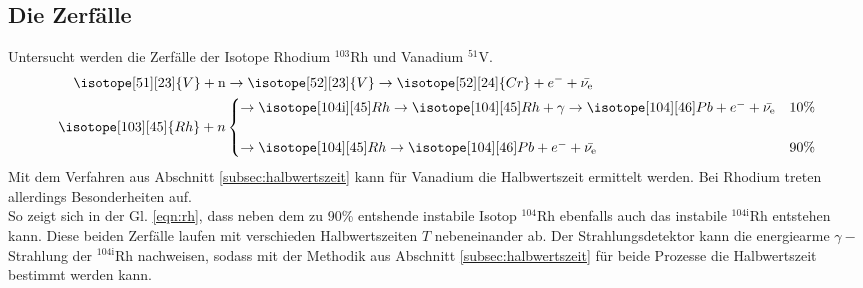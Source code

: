 \subsection{Die Zerfälle}
Untersucht werden die Zerfälle der Isotope Rhodium $^{103}$Rh und Vanadium $^{51}$V.
\begin{align}
    \isotope[51][23]{V} + \text{n} &\to \isotope[52][23]{V} \to \isotope[52][24]{Cr} + e^- + \bar{\nu_{\text{e}}}\\
    \isotope[103][45]{Rh}+n&
    \begin{cases}
        \to \isotope[104\text{i}][45]Rh \to \isotope[104][45]Rh+\gamma \to \isotope[104][46]Pb+e^- + \bar{\nu_{\text{e}}} & 10\%\\\\
        \to \isotope[104][45]Rh \to \isotope[104][46]Pb+e^- + \bar{\nu_{\text{e}}} & 90\%
    \end{cases}
    \label{eqn:rh}
\end{align}
Mit dem Verfahren aus Abschnitt \ref{subsec:halbwertszeit} kann für Vanadium die Halbwertszeit ermittelt werden.
Bei Rhodium treten allerdings Besonderheiten auf.\\
So zeigt sich in der Gl. \ref{eqn:rh}, dass neben dem zu 90\% entshende instabile Isotop $^{104}$Rh ebenfalls
auch das instabile $^{104\text{i}}$Rh entstehen kann. Diese beiden Zerfälle laufen mit verschieden Halbwertszeiten $T$ 
nebeneinander ab. Der Strahlungsdetektor kann die energiearme $\gamma-$Strahlung der $^{104\text{i}}$Rh nachweisen,
sodass mit der Methodik aus Abschnitt \ref{subsec:halbwertszeit} für beide Prozesse 
die Halbwertszeit bestimmt werden kann.